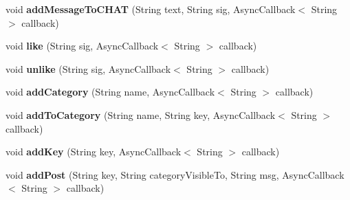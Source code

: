 \begin{DoxyCompactItemize}
\item 
\hypertarget{interfaceballmerpeak_1_1turtlenet_1_1client_1_1TurtlenetAsync_ad476065edadd8a0adf43a634d89c3ae0}{void {\bfseries add\-Message\-To\-C\-H\-A\-T} (String text, String sig, Async\-Callback$<$ String $>$ callback)}\label{interfaceballmerpeak_1_1turtlenet_1_1client_1_1TurtlenetAsync_ad476065edadd8a0adf43a634d89c3ae0}

\item 
\hypertarget{interfaceballmerpeak_1_1turtlenet_1_1client_1_1TurtlenetAsync_a43ea6e283792f49da2130d82e2e97d21}{void {\bfseries like} (String sig, Async\-Callback$<$ String $>$ callback)}\label{interfaceballmerpeak_1_1turtlenet_1_1client_1_1TurtlenetAsync_a43ea6e283792f49da2130d82e2e97d21}

\item 
\hypertarget{interfaceballmerpeak_1_1turtlenet_1_1client_1_1TurtlenetAsync_adf69c36b9b3c38a741edf28b3b64792f}{void {\bfseries unlike} (String sig, Async\-Callback$<$ String $>$ callback)}\label{interfaceballmerpeak_1_1turtlenet_1_1client_1_1TurtlenetAsync_adf69c36b9b3c38a741edf28b3b64792f}

\item 
\hypertarget{interfaceballmerpeak_1_1turtlenet_1_1client_1_1TurtlenetAsync_a10e4779298723a1ba9e00664b0d8246a}{void {\bfseries add\-Category} (String name, Async\-Callback$<$ String $>$ callback)}\label{interfaceballmerpeak_1_1turtlenet_1_1client_1_1TurtlenetAsync_a10e4779298723a1ba9e00664b0d8246a}

\item 
\hypertarget{interfaceballmerpeak_1_1turtlenet_1_1client_1_1TurtlenetAsync_a8540db4f0ac20ac80e8bca4346761257}{void {\bfseries add\-To\-Category} (String name, String key, Async\-Callback$<$ String $>$ callback)}\label{interfaceballmerpeak_1_1turtlenet_1_1client_1_1TurtlenetAsync_a8540db4f0ac20ac80e8bca4346761257}

\item 
\hypertarget{interfaceballmerpeak_1_1turtlenet_1_1client_1_1TurtlenetAsync_a165c61e5dc2d3aac741bf47c07186b01}{void {\bfseries add\-Key} (String key, Async\-Callback$<$ String $>$ callback)}\label{interfaceballmerpeak_1_1turtlenet_1_1client_1_1TurtlenetAsync_a165c61e5dc2d3aac741bf47c07186b01}

\item 
\hypertarget{interfaceballmerpeak_1_1turtlenet_1_1client_1_1TurtlenetAsync_a6bc9fd822a1776de7cb42561e567cc18}{void {\bfseries add\-Post} (String key, String category\-Visible\-To, String msg, Async\-Callback$<$ String $>$ callback)}\label{interfaceballmerpeak_1_1turtlenet_1_1client_1_1TurtlenetAsync_a6bc9fd822a1776de7cb42561e567cc18}


\end{DoxyCompactItemize}
